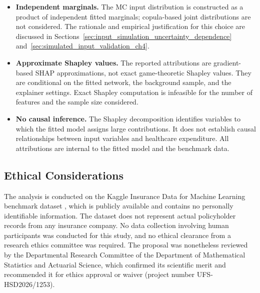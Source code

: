 \begin{itemize}
    \item \textbf{Independent marginals.}  The MC input
          distribution is constructed as a product of independent fitted
          marginals; copula-based joint distributions are not considered.
          The rationale and empirical justification for this choice are
          discussed in Sections~\ref{sec:input_simulation_uncertainty_dependence}
          and~\ref{sec:simulated_input_validation_ch4}.

    \item \textbf{Approximate Shapley values.}  The reported
          attributions are gradient-based SHAP approximations, not
          exact game-theoretic Shapley values.  They are conditional on
          the fitted network, the background sample, and the explainer
          settings.  Exact Shapley computation is infeasible for the
          number of features and the sample size considered.

    \item \textbf{No causal inference.}  The Shapley decomposition
          identifies variables to which the fitted model assigns large
          contributions.  It does not establish causal relationships
          between input variables and healthcare expenditure.  All
          attributions are internal to the fitted model and the benchmark
          data.
\end{itemize}


\subsection{Ethical Considerations}
\label{sec:ethical_considerations}

The analysis is conducted on the Kaggle Insurance Data for
Machine Learning benchmark dataset \citep{kaggleInsuranceDataML}, which is publicly available and
contains no personally identifiable information.  The dataset does not represent actual policyholder records
from any insurance company.  No data collection involving human
participants was conducted for this study, and no ethical clearance from
a research ethics committee was required.  The proposal was nonetheless
reviewed by the Departmental Research Committee of the Department of
Mathematical Statistics and Actuarial Science, which confirmed its
scientific merit and recommended it for ethics approval or waiver
(project number UFS-HSD2026/1253).

